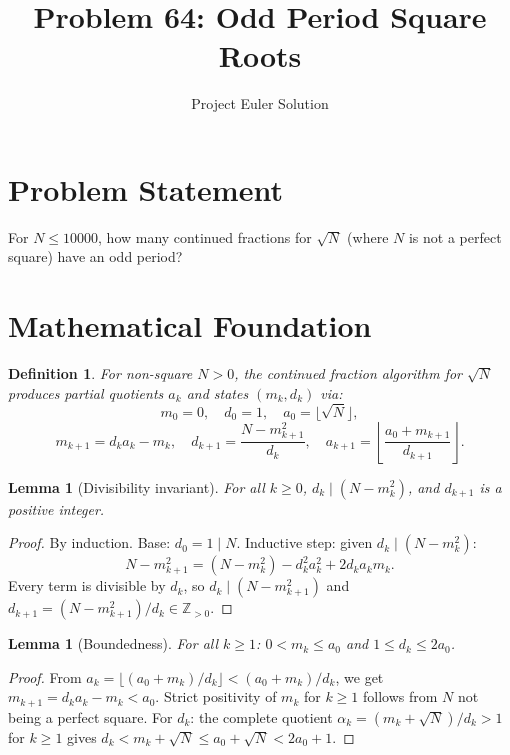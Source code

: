 \documentclass[12pt,a4paper]{article}
\title{Problem 64: Odd Period Square Roots}
\author{Project Euler Solution}
\date{}
\newtheorem{lemma}[theorem]{Lemma}
\newtheorem{definition}[theorem]{Definition}
\begin{document}
\maketitle

\section{Problem Statement}

For $N \le 10000$, how many continued fractions for $\sqrt{N}$ (where $N$ is not a perfect square) have an odd period?

\section{Mathematical Foundation}

\begin{definition}
For non-square $N > 0$, the \emph{continued fraction algorithm} for $\sqrt{N}$ produces partial quotients $a_k$ and states $(m_k, d_k)$ via:
\[
m_0 = 0,\quad d_0 = 1,\quad a_0 = \lfloor \sqrt{N} \rfloor,
\]
\[
m_{k+1} = d_k a_k - m_k,\quad d_{k+1} = \frac{N - m_{k+1}^2}{d_k},\quad a_{k+1} = \left\lfloor \frac{a_0 + m_{k+1}}{d_{k+1}} \right\rfloor.
\]
\end{definition}

\begin{lemma}[Divisibility invariant]
\label{lem:div}
For all $k \ge 0$, $d_k \mid (N - m_k^2)$, and $d_{k+1}$ is a positive integer.
\end{lemma}

\begin{proof}
By induction. Base: $d_0 = 1 \mid N$. Inductive step: given $d_k \mid (N - m_k^2)$:
\[
N - m_{k+1}^2 = (N - m_k^2) - d_k^2 a_k^2 + 2 d_k a_k m_k.
\]
Every term is divisible by $d_k$, so $d_k \mid (N - m_{k+1}^2)$ and $d_{k+1} = (N - m_{k+1}^2)/d_k \in \mathbb{Z}_{>0}$.
\end{proof}

\begin{lemma}[Boundedness]
\label{lem:bound}
For all $k \ge 1$: $0 < m_k \le a_0$ and $1 \le d_k \le 2a_0$.
\end{lemma}

\begin{proof}
From $a_k = \lfloor (a_0 + m_k)/d_k \rfloor < (a_0 + m_k)/d_k$, we get $m_{k+1} = d_k a_k - m_k < a_0$. Strict positivity of $m_k$ for $k \ge 1$ follows from $N$ not being a perfect square. For $d_k$: the complete quotient $\alpha_k = (m_k + \sqrt{N})/d_k > 1$ for $k \ge 1$ gives $d_k < m_k + \sqrt{N} \le a_0 + \sqrt{N} < 2a_0 + 1$.
\end{proof}
\end{document}
